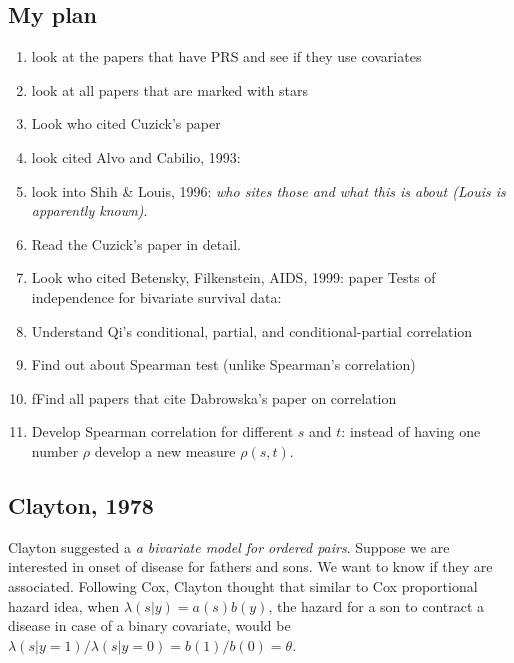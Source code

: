 \documentclass[]{article}
\begin{document}
\subsection{My plan}
\begin{enumerate}[1)]
  \item look at the papers that have PRS and see if they use covariates
  \item look at all papers that are marked with stars
	\item Look who cited Cuzick's paper
	\item look cited Alvo and Cabilio, 1993:
	\item look into Shih \& Louis, 1996: \emph{who sites those and what this is about (Louis is apparently known)}.
	\item Read the Cuzick's paper in detail.
	\item Look who cited Betensky, Filkenstein, AIDS, 1999: paper
Tests of independence for bivariate survival data:
	\item Understand Qi's conditional, partial, and conditional-partial correlation
	\item Find out about Spearman test (unlike Spearman's correlation)
	\item fFind all papers that cite Dabrowska's paper on correlation
	\item Develop Spearman correlation for different $s$ and $t$: instead of having one number $\rho$ develop a new measure $\rho(s, t)$.
\end{enumerate}



\subsection{Clayton, 1978 \cite{clayton1978model}}
Clayton suggested a \textit{a bivariate model for ordered pairs}. Suppose we are interested in onset of disease for fathers and sons. We want to know if they are associated. Following Cox, Clayton thought that similar to Cox proportional hazard idea, when $\lambda(s|y) = a(s)b(y)$, the hazard for a son to contract a disease in case of a binary covariate, would be $\lambda(s|y=1)/\lambda(s|y=0) = b(1)/b(0) = \theta$.
\end{document}
